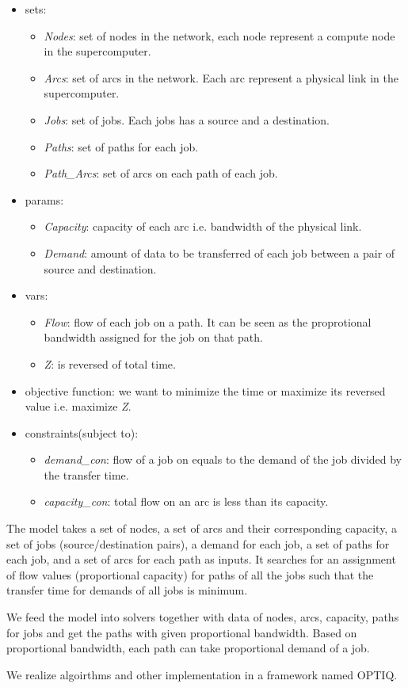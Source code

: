 \begin{itemize}
    \item sets: 
	\begin{itemize}
	    \item \textit{Nodes}: set of nodes in the network, each node represent a compute node in the supercomputer.
	    \item \textit{Arcs}: set of arcs in the network. Each arc represent a physical link in the supercomputer.
	    \item \textit{Jobs}: set of jobs. Each jobs has a source and a destination.
	    \item  \textit{Paths}: set of paths for each job.
	    \item \textit{Path\_Arcs}: set of arcs on each path of each job.
	\end{itemize}
    \item params: 
	\begin{itemize}
	    \item {\it Capacity}: capacity of each arc i.e. bandwidth of the physical link.
	    \item {\it Demand}: amount of data to be transferred of each job between a pair of source and destination.
	\end{itemize}
    \item vars:
	 \begin{itemize}
	    \item \textit{Flow}: flow of each job on a path. It can be seen as the proprotional bandwidth assigned for the job on that path.
	    \item \textit{Z}: is reversed of total time.
	\end{itemize}
    \item objective function: we want to minimize the time or maximize its reversed value i.e. maximize \textit{Z}.
    \item constraints(subject to): 
	\begin{itemize}
	    \item \textit{demand\_con}: flow of a job on equals to the demand of the job divided by the transfer time.
	    \item \textit{capacity\_con}: total flow on an arc is less than its capacity.
	\end{itemize}
\end{itemize}

The model takes a set of nodes, a set of arcs and their corresponding capacity, a set of jobs (source/destination pairs), a demand for each job, a set of paths for each job, and a set of arcs for each path as inputs. It searches for an assignment of flow values (proportional capacity) for paths of all the jobs such that the transfer time for demands of all jobs is minimum.

We feed the model into solvers together with data of nodes, arcs, capacity, paths for jobs and get the paths with given proportional bandwidth. Based on proportional bandwidth, each path can take proportional demand of a job.

We realize algoirthms and other implementation in a framework named OPTIQ.
